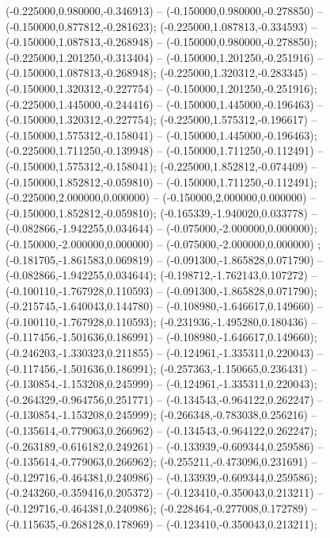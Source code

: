  (-0.225000,0.980000,-0.346913) -- (-0.150000,0.980000,-0.278850) -- (-0.150000,0.877812,-0.281623);
 (-0.225000,1.087813,-0.334593) -- (-0.150000,1.087813,-0.268948) -- (-0.150000,0.980000,-0.278850);
 (-0.225000,1.201250,-0.313404) -- (-0.150000,1.201250,-0.251916) -- (-0.150000,1.087813,-0.268948);
 (-0.225000,1.320312,-0.283345) -- (-0.150000,1.320312,-0.227754) -- (-0.150000,1.201250,-0.251916);
 (-0.225000,1.445000,-0.244416) -- (-0.150000,1.445000,-0.196463) -- (-0.150000,1.320312,-0.227754);
 (-0.225000,1.575312,-0.196617) -- (-0.150000,1.575312,-0.158041) -- (-0.150000,1.445000,-0.196463);
 (-0.225000,1.711250,-0.139948) -- (-0.150000,1.711250,-0.112491) -- (-0.150000,1.575312,-0.158041);
 (-0.225000,1.852812,-0.074409) -- (-0.150000,1.852812,-0.059810) -- (-0.150000,1.711250,-0.112491);
 (-0.225000,2.000000,0.000000) -- (-0.150000,2.000000,0.000000) -- (-0.150000,1.852812,-0.059810);
 (-0.165339,-1.940020,0.033778) -- (-0.082866,-1.942255,0.034644) -- (-0.075000,-2.000000,0.000000);
 (-0.150000,-2.000000,0.000000) -- (-0.075000,-2.000000,0.000000) ;
 (-0.181705,-1.861583,0.069819) -- (-0.091300,-1.865828,0.071790) -- (-0.082866,-1.942255,0.034644);
 (-0.198712,-1.762143,0.107272) -- (-0.100110,-1.767928,0.110593) -- (-0.091300,-1.865828,0.071790);
 (-0.215745,-1.640043,0.144780) -- (-0.108980,-1.646617,0.149660) -- (-0.100110,-1.767928,0.110593);
 (-0.231936,-1.495280,0.180436) -- (-0.117456,-1.501636,0.186991) -- (-0.108980,-1.646617,0.149660);
 (-0.246203,-1.330323,0.211855) -- (-0.124961,-1.335311,0.220043) -- (-0.117456,-1.501636,0.186991);
 (-0.257363,-1.150665,0.236431) -- (-0.130854,-1.153208,0.245999) -- (-0.124961,-1.335311,0.220043);
 (-0.264329,-0.964756,0.251771) -- (-0.134543,-0.964122,0.262247) -- (-0.130854,-1.153208,0.245999);
 (-0.266348,-0.783038,0.256216) -- (-0.135614,-0.779063,0.266962) -- (-0.134543,-0.964122,0.262247);
 (-0.263189,-0.616182,0.249261) -- (-0.133939,-0.609344,0.259586) -- (-0.135614,-0.779063,0.266962);
 (-0.255211,-0.473096,0.231691) -- (-0.129716,-0.464381,0.240986) -- (-0.133939,-0.609344,0.259586);
 (-0.243260,-0.359416,0.205372) -- (-0.123410,-0.350043,0.213211) -- (-0.129716,-0.464381,0.240986);
 (-0.228464,-0.277008,0.172789) -- (-0.115635,-0.268128,0.178969) -- (-0.123410,-0.350043,0.213211);
